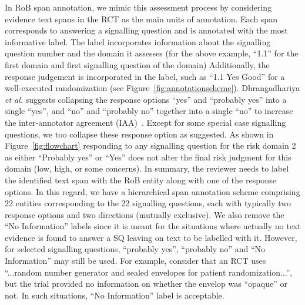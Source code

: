 \documentclass[sn-mathphys,Numbered]{sn-jnl}%
\theoremstyle{thmstyleone}%
\theoremstyle{thmstyletwo}%
\theoremstyle{thmstylethree}%
\begin{document}
In RoB span annotation, we mimic this assessment process by considering evidence text spans in the RCT as the main units of annotation. 
Each span corresponds to answering a signalling question and is annotated with the most informative label. 
The label incorporates information about the signalling question number and the domain it assesses (for the above example, ``1.1'' for the first domain and first signalling question of the domain)
Additionally, the response judgement is incorporated in the label, such as ``1.1 Yes Good'' for a well-executed randomization (see Figure~\ref{fig:annotationscheme}).
Dhrangadhariya \textit{et al.} suggests collapsing the response options ``yes'' and ``probably yes'' into a single ``yes'', and ``no'' and ``probably no'' together into a single ``no'' to increase the inter-annotator agreement (IAA)~\cite{dhrangadhariya2023first}.
Except for some special case signalling questions, we too collapse these response option as suggested.
As shown in Figure~\ref{fig:flowchart} responding to any signalling question for the risk domain 2 as either ``Probably yes'' or ``Yes'' does not alter the final risk judgment for this domain (low, high, or some concerns).
In summary, the reviewer needs to label the identified text span with the RoB entity along with one of the response options.
In this regard, we have a hierarchical span annotation scheme comprising 22 entities corresponding to the 22 signalling questions, each with typically two response options and two directions (mutually exclusive).
We also remove the ``No Information'' labels since it is meant for the situations where actually no text evidence is found to answer a SQ leaving on text to be labelled with it.
However, for selected signalling questions, ``probably yes'', ``probably no'' and ``No Information'' may still be used.
For example, consider that an RCT uses ``...random number generator and sealed envelopes for patient randomization...'', but the trial provided no information on whether the envelop was ``opaque'' or not.
In such situations, ``No Information'' label is acceptable.
\end{document}
